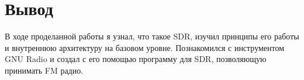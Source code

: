 \chapter{Вывод}
\label{ch:chap3}

В ходе проделанной работы я узнал, что такое SDR, изучил принципы его работы и внутреннюю архитектуру на базовом уровне.  
Познакомился с инструментом GNU Radio и создал с его помощью программу для SDR, позволяющую принимать FM радио.  

\endinput